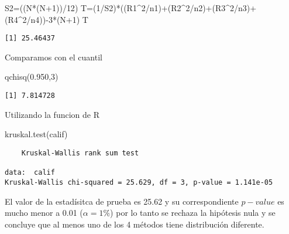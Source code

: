 \documentclass[
  a4paper,
  oneside,
  openany]{book}
\newenvironment{Shaded}{\begin{snugshade}}{\end{snugshade}}
\newcommand{\DecValTok}[1]{\textcolor[rgb]{0.00,0.00,0.81}{#1}}
\newcommand{\FloatTok}[1]{\textcolor[rgb]{0.00,0.00,0.81}{#1}}
\newcommand{\FunctionTok}[1]{\textcolor[rgb]{0.00,0.00,0.00}{#1}}
\newcommand{\NormalTok}[1]{#1}
\newcommand{\OtherTok}[1]{\textcolor[rgb]{0.56,0.35,0.01}{#1}}
\newcommand{\SpecialCharTok}[1]{\textcolor[rgb]{0.00,0.00,0.00}{#1}}
\begin{document}
\begin{Shaded}
\begin{Highlighting}[]
\NormalTok{S2}\OtherTok{=}\NormalTok{((N}\SpecialCharTok{*}\NormalTok{(N}\SpecialCharTok{+}\DecValTok{1}\NormalTok{))}\SpecialCharTok{/}\DecValTok{12}\NormalTok{)}
\NormalTok{T}\OtherTok{=}\NormalTok{(}\DecValTok{1}\SpecialCharTok{/}\NormalTok{S2)}\SpecialCharTok{*}\NormalTok{((R1}\SpecialCharTok{\^{}}\DecValTok{2}\SpecialCharTok{/}\NormalTok{n1)}\SpecialCharTok{+}\NormalTok{(R2}\SpecialCharTok{\^{}}\DecValTok{2}\SpecialCharTok{/}\NormalTok{n2)}\SpecialCharTok{+}\NormalTok{(R3}\SpecialCharTok{\^{}}\DecValTok{2}\SpecialCharTok{/}\NormalTok{n3)}\SpecialCharTok{+}\NormalTok{(R4}\SpecialCharTok{\^{}}\DecValTok{2}\SpecialCharTok{/}\NormalTok{n4))}\SpecialCharTok{{-}}\DecValTok{3}\SpecialCharTok{*}\NormalTok{(N}\SpecialCharTok{+}\DecValTok{1}\NormalTok{)}
\NormalTok{T}
\end{Highlighting}
\end{Shaded}

\begin{verbatim}
[1] 25.46437
\end{verbatim}

Comparamos con el cuantil

\begin{Shaded}
\begin{Highlighting}[]
\FunctionTok{qchisq}\NormalTok{(}\FloatTok{0.950}\NormalTok{,}\DecValTok{3}\NormalTok{)}
\end{Highlighting}
\end{Shaded}

\begin{verbatim}
[1] 7.814728
\end{verbatim}

Utilizando la funcion de R

\begin{Shaded}
\begin{Highlighting}[]
\FunctionTok{kruskal.test}\NormalTok{(calif)}
\end{Highlighting}
\end{Shaded}

\begin{verbatim}
    Kruskal-Wallis rank sum test

data:  calif
Kruskal-Wallis chi-squared = 25.629, df = 3, p-value = 1.141e-05
\end{verbatim}

El valor de la estadísitca de prueba es 25.62 y su correspondiente \(p-value\) es mucho menor a 0.01 (\(\alpha=1\%\)) por lo tanto se rechaza la hipótesis nula y se concluye que al menos uno de los 4 métodos tiene distribución diferente.
\end{document}
